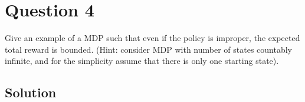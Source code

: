 \section*{Question 4}

Give an example of a MDP such that even if the policy is improper, the expected total reward is bounded.
(Hint: consider MDP with number of states countably infinite, and for the simplicity assume that there is only one starting state).

\subsection*{Solution}

